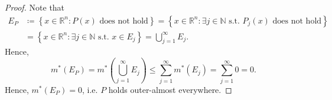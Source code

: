 \begin{proof}
    Note that 
    \begin{align*}
        E_P &\coloneqq \left\{ x \in \mathbb{R} ^n: P(x) \text{ does not hold}  \right\} = \left\{ x \in \mathbb{R} ^n: \exists j \in \mathbb{N} \text{ s.t. } P_j(x) \text{ does not hold}   \right\} \\
        &= \left\{ x \in \mathbb{R} ^n: \exists j \in \mathbb{N} \text{ s.t. } x \in E_j  \right\} = \bigcup_{j = 1}^{\infty} E_j.    
    \end{align*}
    Hence,
    \[
        m^*(E_P) = m^* \left( \bigcup_{j=1}^{\infty} E_j  \right) \le \sum_{j=1}^{\infty} m^*(E_j) = \sum_{j = 1}^{\infty} 0 = 0.   
    \]
    Hence, \(m^*(E_P) = 0\), i.e. \(P\) holds outer-almost everywhere.  
\end{proof}